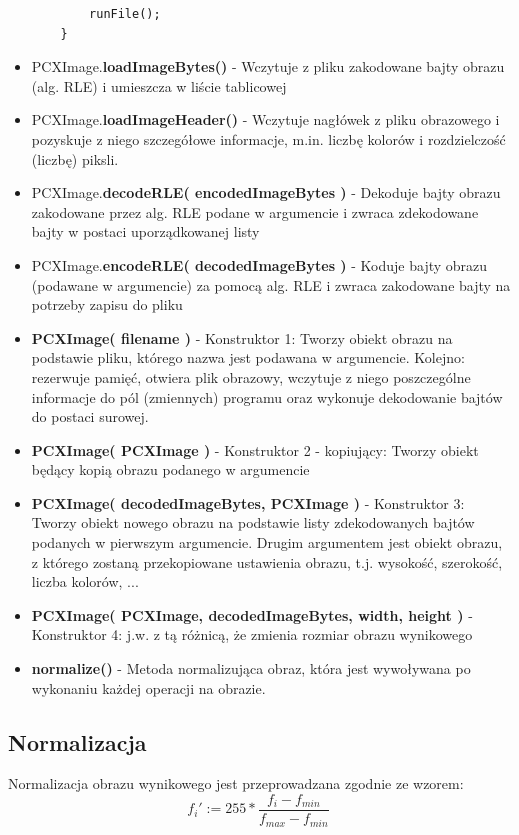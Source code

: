 \documentclass{article}
\begin{document}
\begin{itemize}
\begin{verbatim}
        runFile();
    }
	\end{verbatim}
\item PCXImage.\textbf{loadImageBytes()} - Wczytuje z pliku zakodowane bajty obrazu (alg. RLE) i umieszcza w liście  tablicowej
\item PCXImage.\textbf{loadImageHeader()} - Wczytuje nagłówek z pliku obrazowego i pozyskuje z niego szczegółowe informacje, m.in. liczbę kolorów i rozdzielczość (liczbę) piksli.
\item PCXImage.\textbf{decodeRLE( encodedImageBytes )} - Dekoduje bajty obrazu zakodowane przez alg. RLE podane w argumencie i zwraca zdekodowane bajty w postaci uporządkowanej listy
\item PCXImage.\textbf{encodeRLE( decodedImageBytes )} - Koduje bajty obrazu (podawane w argumencie) za pomocą alg. RLE i zwraca zakodowane bajty na potrzeby zapisu do pliku
\item \textbf{PCXImage( filename )} - Konstruktor 1: Tworzy obiekt obrazu na podstawie pliku, którego nazwa jest podawana w argumencie. Kolejno: rezerwuje pamięć, otwiera plik obrazowy, wczytuje z niego poszczególne informacje do pól (zmiennych) programu oraz wykonuje dekodowanie bajtów do postaci surowej.
\item \textbf{PCXImage( PCXImage )} - Konstruktor 2 - kopiujący: Tworzy obiekt będący kopią obrazu podanego w argumencie 
\item \textbf{PCXImage( decodedImageBytes, PCXImage )} - Konstruktor 3: Tworzy obiekt nowego obrazu na podstawie listy zdekodowanych bajtów podanych w pierwszym argumencie. Drugim argumentem jest obiekt obrazu, z którego zostaną przekopiowane ustawienia obrazu, t.j. wysokość, szerokość, liczba kolorów, ...
\item \textbf{PCXImage( PCXImage, decodedImageBytes, width, height )} - Konstruktor 4: j.w. z tą różnicą, że zmienia rozmiar obrazu wynikowego
\item \textbf{normalize()} - Metoda normalizująca obraz, która jest wywoływana po wykonaniu każdej operacji na obrazie.
\end{itemize}


\subsection{Normalizacja}
Normalizacja obrazu wynikowego jest przeprowadzana zgodnie ze wzorem:
		\begin{equation*}
		f_{i}' := 255* \frac{f_{i}-f_{min}}{f_{max}-f_{min}} \
		\end{equation*}
\end{document}
